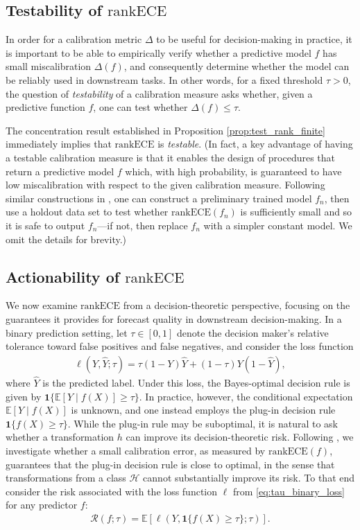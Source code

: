 \documentclass[11pt]{article}
\numberwithin{equation}{section}
\theoremstyle{definition}
\newcommand{\E}{\mathbb{E}}
\newcommand{\cH}{\mathcal{H}}
\newcommand{\cR}{\mathcal{R}}
\newcommand{\one}{\bm{1}}
\newcommand{\rankECE}{\mathrm{rankECE}}
\begin{document}
\subsection{Testability of $\rankECE$}
In order for a calibration metric $\Delta$ to be useful for decision-making in practice, it is important to be able to empirically verify whether a predictive model $f$ has small miscalibration $\Delta(f)$, and consequently determine whether the model can be reliably used in downstream tasks. In other words, for a fixed threshold $\tau>0$, the question of \textit{testability} of a calibration measure asks whether, given a predictive function $f$, one can test whether $\Delta(f)\leq\tau$.

The concentration result established in Proposition \ref{prop:test_rank_finite} immediately implies that $\rankECE$ is \textit{testable}. (In fact, a key advantage of having a testable calibration measure is that it enables the design of procedures that return a predictive model $f$ which, with high probability, is guaranteed to have low miscalibration with respect to the given calibration measure. Following similar constructions in \citet{blasiok2023smooth,rossellini2025can}, one can construct a preliminary trained model $f_n$, then use a holdout data set to test whether $\rankECE(f_n)$ is sufficiently small and so it is safe to output $f_n$---if not, then replace $f_n$ with a simpler constant model. We omit the details for brevity.)

\subsection{Actionability of $\rankECE$}
We now examine $\rankECE$ from a decision-theoretic perspective, focusing on the guarantees it provides for forecast quality in downstream decision-making. In a binary prediction setting, let $\tau \in [0,1]$ denote the decision maker's relative tolerance toward false positives and false negatives, and consider the loss function
\begin{align}\label{eq:tau_binary_loss}
    \ell(Y, \hat Y; \tau) = \tau(1-Y)\hat Y + (1-\tau)Y(1-\hat Y),
\end{align}
where $\hat Y$ is the predicted label. Under this loss, the Bayes-optimal decision rule is given by $\one\{\E[Y\mid f(X)]\geq\tau\}$. In practice, however, the conditional expectation $\E[Y\mid f(X)]$ is unknown, and one instead employs the plug-in decision rule $\one\{f(X)\geq \tau\}$. While the plug-in rule may be suboptimal, it is natural to ask whether a transformation $h$ can improve its decision-theoretic risk. Following \cite{rossellini2025can}, we investigate whether a small calibration error, as measured by $\rankECE(f)$, guarantees that the plug-in decision rule is close to optimal, in the sense that transformations from a class $\cH$ cannot substantially improve its risk. To that end consider the risk associated with the loss function $\ell$ from \eqref{eq:tau_binary_loss} for any predictor $f$:
\begin{align*}
    \cR(f; \tau) = \E\left[\ell\left(Y, \one\{f(X)\geq \tau\}; \tau\right)\right].
\end{align*}
\end{document}
